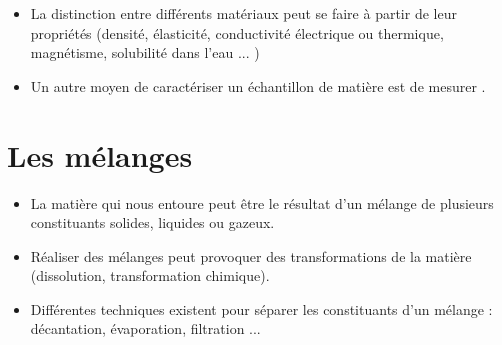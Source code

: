\documentclass[xcolor={dvipsnames}]{beamer}
\begin{document}
\begin{frame}


\begin{block}{}
	\begin{itemize}
		\item La distinction entre différents matériaux peut se faire à partir de leur propriétés (densité, élasticité, conductivité électrique ou thermique, magnétisme, solubilité dans l'eau ...  )
		
		\item Un autre moyen de caractériser un échantillon de matière est de mesurer . 
	\end{itemize}
	
		
\end{block}

\end{frame}

\section{Les mélanges}

\begin{frame}
	\begin{block}{}
		\begin{itemize}
			\item La matière qui nous entoure peut être le résultat d'un mélange de plusieurs constituants solides, liquides ou gazeux.\pause
			
			\item Réaliser des mélanges peut provoquer des transformations de la matière (dissolution, transformation chimique).\pause
			
			\item Différentes techniques existent pour séparer les constituants d'un mélange : décantation, évaporation, filtration ...
		\end{itemize}
	
	
	\end{block}

\end{frame}
\end{document}
